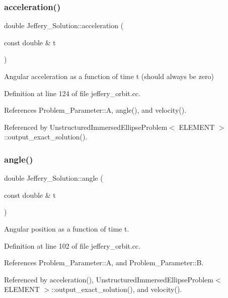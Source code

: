 \subsubsection{\texorpdfstring{acceleration()}{acceleration()}}
{\footnotesize\ttfamily double Jeffery\+\_\+\+Solution\+::acceleration (\begin{DoxyParamCaption}\item[{const double \&}]{t }\end{DoxyParamCaption})}



Angular acceleration as a function of time t (should always be zero) 



Definition at line 124 of file jeffery\+\_\+orbit.\+cc.



References Problem\+\_\+\+Parameter\+::A, angle(), and velocity().



Referenced by Unstructured\+Immersed\+Ellipse\+Problem$<$ E\+L\+E\+M\+E\+N\+T $>$\+::output\+\_\+exact\+\_\+solution().

\mbox{\label{namespaceJeffery__Solution_ad3bd18834ecba370674e34242f8125c1}} 
\subsubsection{\texorpdfstring{angle()}{angle()}}
{\footnotesize\ttfamily double Jeffery\+\_\+\+Solution\+::angle (\begin{DoxyParamCaption}\item[{const double \&}]{t }\end{DoxyParamCaption})}



Angular position as a function of time t. 



Definition at line 102 of file jeffery\+\_\+orbit.\+cc.



References Problem\+\_\+\+Parameter\+::A, and Problem\+\_\+\+Parameter\+::B.



Referenced by acceleration(), Unstructured\+Immersed\+Ellipse\+Problem$<$ E\+L\+E\+M\+E\+N\+T $>$\+::output\+\_\+exact\+\_\+solution(), and velocity().

